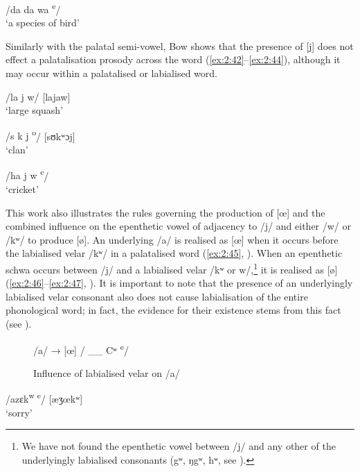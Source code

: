 \ea \label{ex:2:41}
\textup{/da da wa  \textsuperscript{e}}\textup{/  \ExampleSpace   [dɛdɛwɛ]}\\
\glt  ‘a species of bird’
\z

Similarly with the palatal semi-vowel, Bow shows that the presence of [j] does not effect a palatalisation prosody across the word (\ref{ex:2:42}--\ref{ex:2:44}), although it may occur within a palatalised or labialised word.

\ea \label{ex:2:42}
\textup{/la j w/   \ExampleSpace \hspace{5pt} [lajaw]}\\
\glt  ‘large squash’
\z

\ea \label{ex:2:43}
\textup{/s k j \textsuperscript{o}}\textup{/    \ExampleSpace \hspace{5pt}   [sʊkʷɔj] }\\
\glt  ‘clan’    
\z

\ea \label{ex:2:44}
\textup{/ha j w\textsuperscript{ e}}\textup{/     \ExampleSpace [hɛjɛw]}\\
\glt  ‘cricket’  
\z

This work also illustrates the rules governing the production of [œ] and the combined influence on the epenthetic vowel of adjacency to /j/ and either /w/ or /kʷ/  to produce [ø]. An underlying /a/ is realised as [œ] when it occurs before the labialised velar /kʷ/ in a palatalised word (\ref{ex:2:45}, ). When an epenthetic schwa occurs between /j/ and a labialised velar /kʷ or w/,\footnote{We have not found the epenthetic vowel between /j/ and any other of the underlyingly labialised consonants (gʷ, ŋgʷ, hʷ, see ). } it is realised as [ø] (\ref{ex:2:46}--\ref{ex:2:47}, ). It is important to note that the presence of an underlyingly labialised velar consonant also does not cause labialisation of the entire phonological word; in fact, the evidence for their existence stems from this fact (see ). 

\begin{figure}\caption{Influence of labialised velar on /a/\label{fig:2.6}}
\begin{centering}/a/ → [œ] /   \_\_ Cʷ \textsuperscript{e}/\end{centering}
\end{figure}

\ea \label{ex:2:45}
\textup{/azɛk\textsuperscript{w  e}}\textup{/ \ExampleSpace [æʒœkʷ}\textup{]}\\
\glt  ‘sorry’
\z

